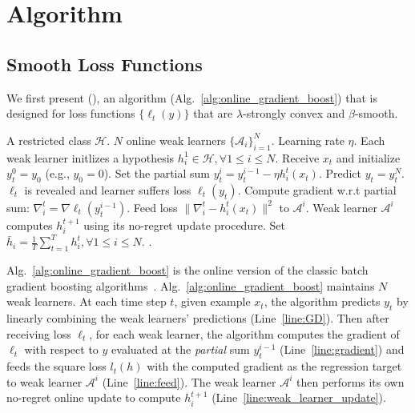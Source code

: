 \section{Algorithm}
\label{sec:sgb_algorithm}

\subsection{Smooth Loss Functions}
We first present \algname (\algshort), an algorithm (Alg.~\ref{alg:online_gradient_boost}) that is designed for loss functions $\{\ell_t(y)\}$ that are $\lambda$-strongly convex and $\beta$-smooth. 
\begin{algorithm}[tb]
\caption{\algname (\algshort)}
 \label{alg:online_gradient_boost}
\begin{algorithmic}[1]
   A restricted  class $\mathcal{H}$. $N$ online weak learners $\{\mathcal{A}_i\}_{i=1}^N$. Learning rate $\eta$.
  \STATE Each weak learner initlizes a hypothesis $h_i^1\in\mathcal{H},\forall 1\leq i\leq N$.
    \STATE Receive  $x_t$ and initialize $y_t^{0} = y_0$ (e.g., $y_0 = 0$). 
    \label{line:GD}
        \STATE Set the partial sum $y_t^{i} = y_t^{i-1} - \eta h_i^{t}(x_t)$.
    \ENDFOR
    \STATE Predict $y_t = y_t^N$.
    \STATE $\ell_t$ is revealed and learner suffers loss $\ell_t(y_t)$.
        \STATE Compute gradient w.r.t partial sum: $\nabla_i^t = \nabla\ell_t(y_t^{i-1})$.
        \label{line:gradient}
        \STATE Feed loss $\|\nabla_i^t - h_i^t(x_t)\|^2$ to $\mathcal{A}^i$.
        \label{line:feed}
        \STATE Weak learner $\mathcal{A}^i$ computes $h_i^{t+1}$ using its no-regret update procedure.
        \label{line:weak_learner_update}
    \ENDFOR
 \ENDFOR
 \STATE Set $\bar{h}_i =\frac{1}{T} \sum_{t=1}^Th_{i}^t,\forall 1\leq i\leq N$. \label{line:average}
 . \label{line:stoch_return} 
\end{algorithmic}
\end{algorithm}
Alg.~\ref{alg:online_gradient_boost} is the online version of the classic batch gradient boosting algorithms~\citep{friedman2001greedy,grubb2011generalized}. Alg.~\ref{alg:online_gradient_boost} maintains $N$ weak learners. At each time step $t$, given example $x_t$, the algorithm predicts $y_t$ by linearly combining the weak learners' predictions (Line~\ref{line:GD}). Then after receiving loss $\ell_t$, for each weak learner, the algorithm computes the gradient of $\ell_t$ with respect to $y$ evaluated at the \emph{partial} sum $y_t^{i-1}$ (Line~\ref{line:gradient}) and feeds the square loss  $l_t(h)$ with the computed gradient as the regression target to weak learner $\mathcal{A}^i$ (Line~\ref{line:feed}). The weak learner $\mathcal{A}^i$ then performs its own no-regret online update to compute $h_{i}^{t+1}$ (Line~\ref{line:weak_learner_update}).

